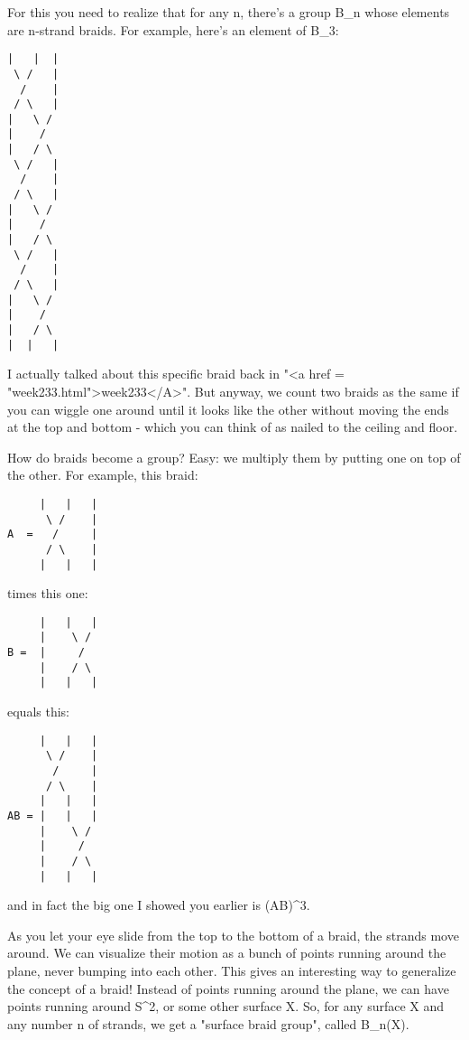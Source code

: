 For this you need to realize that for any n, there's a group B_{n}
whose elements are n-strand braids.  For example, here's an element
of B_{3}:

\begin{verbatim}
|   |  |  
 \ /   | 
  /    |       
 / \   |
|   \ /    
|    /         
|   / \   
 \ /   | 
  /    |      
 / \   |
|   \ /    
|    /        
|   / \   
 \ /   | 
  /    |      
 / \   |
|   \ /    
|    /         
|   / \   
|  |   |
\end{verbatim}
    

I actually talked about this specific braid back in "<a href =
"week233.html">week233</A>".  But anyway, we count two braids as
the same if you can wiggle one around until it looks like the other
without moving the ends at the top and bottom - which you can think of
as nailed to the ceiling and floor.

How do braids become a group?  Easy: we multiply them by putting 
one on top of the other.  For example, this braid:

\begin{verbatim}
     |   |   |
      \ /    |
A  =   /     |
      / \    |
     |   |   |
\end{verbatim}
    
times this one:

\begin{verbatim}
     |   |   |   
     |    \ /    
B =  |     /    
     |    / \  
     |   |   |
\end{verbatim}
    
equals this:

\begin{verbatim}
     |   |   |
      \ /    |
       /     |
      / \    |
     |   |   |
AB = |   |   |   
     |    \ /    
     |     /    
     |    / \  
     |   |   |
\end{verbatim}
    
and in fact the big one I showed you earlier is (AB)^{3}.  

As you let your eye slide from the top to the bottom of a braid, the
strands move around.  We can visualize their motion as a bunch of
points running around the plane, never bumping into each other.  This
gives an interesting way to generalize the concept of a braid!
Instead of points running around the plane, we can have points running
around S^{2}, or some other surface X.  So, for any surface
X and any number n of strands, we get a "surface braid
group", called B_{n}(X).

